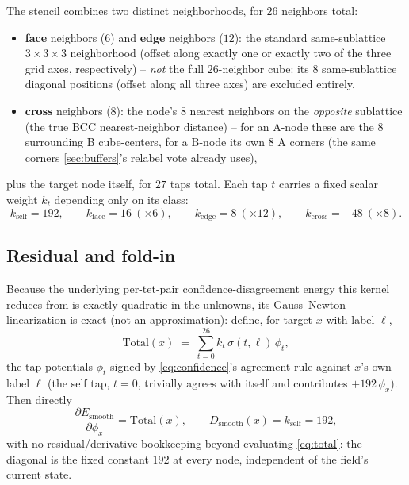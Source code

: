 \documentclass[11pt]{article}
\begin{document}
The stencil combines two distinct neighborhoods, for $26$ neighbors total:
\begin{itemize}
  \item \textbf{face} neighbors ($6$) and \textbf{edge} neighbors ($12$):
  the standard same-sublattice $3\times3\times3$ neighborhood (offset along
  exactly one or exactly two of the three grid axes, respectively) --
  \emph{not} the full $26$-neighbor cube: its $8$ same-sublattice diagonal
  positions (offset along all three axes) are excluded entirely,
  \item \textbf{cross} neighbors ($8$): the node's $8$ nearest neighbors on
  the \emph{opposite} sublattice (the true BCC nearest-neighbor distance) --
  for an A-node these are the $8$ surrounding B cube-centers, for a B-node
  its own $8$ A corners (the same corners \eqref{sec:buffers}'s relabel
  vote already uses),
\end{itemize}
plus the target node itself, for $27$ taps total. Each tap $t$ carries a
fixed scalar weight $k_t$ depending only on its class:
\begin{equation}
  k_{\text{self}} = 192, \qquad k_{\text{face}} = 16 \ (\times 6), \qquad
  k_{\text{edge}} = 8 \ (\times 12), \qquad k_{\text{cross}} = -48\ (\times
  8).
  \label{eq:smoothkernel}
\end{equation}

\subsection{Residual and fold-in}

Because the underlying per-tet-pair confidence-disagreement energy this
kernel reduces from is exactly quadratic in the unknowns, its
Gauss--Newton linearization is exact (not an approximation): define, for
target $x$ with label $\ell$,
\begin{equation}
  \mathrm{Total}(x) \;=\; \sum_{t=0}^{26} k_t\,\sigma(t,\ell)\,\phi_t,
  \label{eq:total}
\end{equation}
the tap potentials $\phi_t$ signed by \eqref{eq:confidence}'s agreement
rule against $x$'s own label $\ell$ (the self tap, $t{=}0$, trivially
agrees with itself and contributes $+192\,\phi_x$). Then directly
\begin{equation}
  \frac{\partial E_{\text{smooth}}}{\partial\phi_x} = \mathrm{Total}(x),
  \qquad D_{\text{smooth}}(x) = k_{\text{self}} = 192,
\end{equation}
with no residual/derivative bookkeeping beyond evaluating
\eqref{eq:total}: the diagonal is the fixed constant $192$ at every node,
independent of the field's current state.
\end{document}
